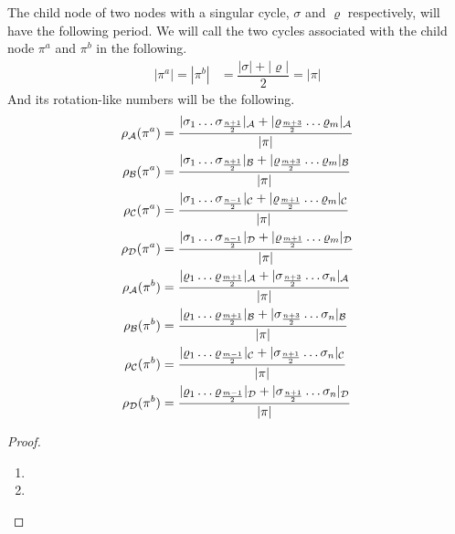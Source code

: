 \begin{theorem}
    The child node of two nodes with a singular cycle, $\sigma$ and $\varrho$ respectively, will have the following period.
    We will call the two cycles associated with the child node $\pi^a$ and $\pi^b$ in the following.
    \begin{align*}
        |\pi^a| = |\pi^b| & = \dfrac{|\sigma| + |\varrho|}{2} = |\pi|
    \end{align*}
    And its rotation-like numbers will be the following.
    \begin{align*}
        \rho_{\mathcal{A}}(\pi^a) & = \dfrac{|\sigma_1 \dots \sigma_{\frac{n+1}{2}}|_{\mathcal{A}} + |\varrho_{\frac{m+3}{2}} \dots \varrho_m|_{\mathcal{A}}}{|\pi|} \\
        \rho_{\mathcal{B}}(\pi^a) & = \dfrac{|\sigma_1 \dots \sigma_{\frac{n+1}{2}}|_{\mathcal{B}} + |\varrho_{\frac{m+3}{2}} \dots \varrho_m|_{\mathcal{B}}}{|\pi|} \\
        \rho_{\mathcal{C}}(\pi^a) & = \dfrac{|\sigma_1 \dots \sigma_{\frac{n-1}{2}}|_{\mathcal{C}} + |\varrho_{\frac{m+1}{2}} \dots \varrho_m|_{\mathcal{C}}}{|\pi|} \\
        \rho_{\mathcal{D}}(\pi^a) & = \dfrac{|\sigma_1 \dots \sigma_{\frac{n-1}{2}}|_{\mathcal{D}} + |\varrho_{\frac{m+1}{2}} \dots \varrho_m|_{\mathcal{D}}}{|\pi|} \\
        \rho_{\mathcal{A}}(\pi^b) & = \dfrac{|\varrho_1 \dots \varrho_{\frac{m+1}{2}}|_{\mathcal{A}} + |\sigma_{\frac{n+3}{2}} \dots \sigma_n|_{\mathcal{A}}}{|\pi|} \\
        \rho_{\mathcal{B}}(\pi^b) & = \dfrac{|\varrho_1 \dots \varrho_{\frac{m+1}{2}}|_{\mathcal{B}} + |\sigma_{\frac{n+3}{2}} \dots \sigma_n|_{\mathcal{B}}}{|\pi|} \\
        \rho_{\mathcal{C}}(\pi^b) & = \dfrac{|\varrho_1 \dots \varrho_{\frac{m-1}{2}}|_{\mathcal{C}} + |\sigma_{\frac{n+1}{2}} \dots \sigma_n|_{\mathcal{C}}}{|\pi|} \\
        \rho_{\mathcal{D}}(\pi^b) & = \dfrac{|\varrho_1 \dots \varrho_{\frac{m-1}{2}}|_{\mathcal{D}} + |\sigma_{\frac{n+1}{2}} \dots \sigma_n|_{\mathcal{D}}}{|\pi|}
    \end{align*}
\end{theorem}

\begin{proof} \phantom{x}
    \begin{enumerate}
        \item {}
        \item {}
    \end{enumerate}
\end{proof}

